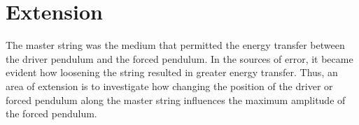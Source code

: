 \documentclass[letterpaper, 12pt]{article}
\begin{document}
\section{Extension}

The master string was the medium that permitted the energy
transfer between the driver pendulum and the forced pendulum.
In the sources of error, it became evident how loosening the
string resulted in greater energy transfer. Thus, an area
of extension is to investigate how changing the position
of the driver or forced pendulum along the
master string influences the maximum amplitude of the
forced pendulum.



\end{document}
